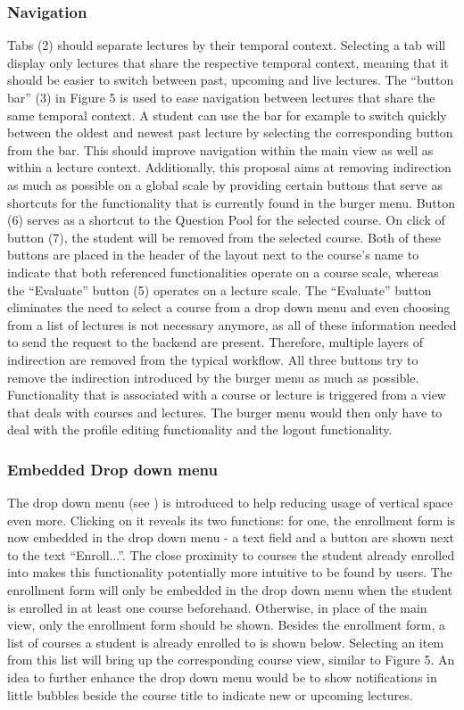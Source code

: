 \subsubsection{Navigation}
Tabs (2) should separate lectures by their temporal context. Selecting a tab will display only lectures that share the respective temporal context, meaning that it should be easier to switch between past, upcoming and live lectures.
The “button bar” (3) in Figure 5 is used to ease navigation between lectures that share the same temporal context. A student can use the bar for example to switch quickly between the oldest and newest past lecture by selecting the corresponding button from the bar. This should improve navigation within the main view as well as within a lecture context. 
Additionally, this proposal aims at removing indirection as much as possible on a global scale by providing certain buttons that serve as shortcuts for the functionality that is currently found in the burger menu. Button (6) serves as a shortcut to the Question Pool for the selected course. On click of button (7), the student will be removed from the selected course. Both of these buttons are placed in the header of the layout next to the course’s name to indicate that both referenced functionalities operate on a course scale, whereas the “Evaluate” button (5) operates on a lecture scale. The “Evaluate” button eliminates the need to select a course from a drop down menu and even choosing from a list of lectures is not necessary anymore, as all of these information needed to send the request to the backend are present. Therefore, multiple layers of indirection are removed from the typical workflow. All three buttons try to remove the indirection introduced by the burger menu as much as possible. Functionality that is associated with a course or lecture is triggered from a view that deals with courses and lectures. The burger menu would then only have to deal with the profile editing functionality and the logout functionality.

\subsubsection{Embedded Drop down menu}
The drop down menu (see \todogrf) is introduced to help reducing usage of vertical space even more. Clicking on it reveals its two functions: for one, the enrollment form is now embedded in the drop down menu - a text field and a button are shown next to the text “Enroll...”. The close proximity to courses the student already enrolled into makes this functionality potentially more intuitive to be found by users. The enrollment form will only be embedded in the drop down menu when the student is enrolled in at least one course beforehand. Otherwise, in place of the main view, only the enrollment form should be shown. Besides the enrollment form, a list of courses a student is already enrolled to is shown below. Selecting an item from this list will bring up the corresponding course view, similar to Figure 5. An idea to further enhance the drop down menu would be to show notifications in little bubbles beside the course title to indicate new or upcoming lectures.


